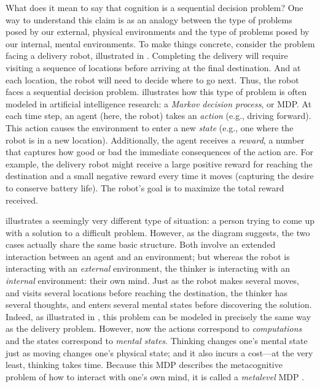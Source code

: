 \documentclass[dsingle]{memo}
\begin{document}
What does it mean to say that cognition is a sequential decision problem? One way to understand this claim is as an analogy between the type of problems posed by our external, physical environments and the type of problems posed by our internal, mental environments. To make things concrete, consider the problem facing a delivery robot, illustrated in . Completing the delivery will require visiting a sequence of locations before arriving at the final destination. And at each location, the robot will need to decide where to go next. Thus, the robot faces a sequential decision problem.  illustrates how this type of problem is often modeled in artificial intelligence research: a \emph{Markov decision process}, or MDP. At each time step, an agent (here, the robot) takes an \emph{action} (e.g., driving forward). This action causes the environment to enter a new \emph{state} (e.g., one where the robot is in a new location). Additionally, the agent receives a \emph{reward}, a number that captures how good or bad the immediate consequences of the action are. For example, the delivery robot might receive a large positive reward for reaching the destination and a small negative reward every time it moves (capturing the desire to conserve battery life). The robot's goal is to maximize the total reward received.

 illustrates a seemingly very different type of situation: a person trying to come up with a solution to a difficult problem. However, as the diagram suggests, the two cases actually share the same basic structure. Both involve an extended interaction between an agent and an environment; but whereas the robot is interacting with an \emph{external} environment, the thinker is interacting with an \emph{internal} environment: their own mind. Just as the robot makes several moves, and visits several locations before reaching the destination, the thinker has several thoughts, and enters several mental states before discovering the solution. Indeed, as illustrated in , this problem can be modeled in precisely the same way as the delivery problem. However, now the actions correspond to \emph{computations} and the states correspond to \emph{mental states}. Thinking changes one's mental state just as moving changes one's physical state; and it also incurs a cost---at the very least, thinking takes time. Because this MDP describes the metacognitive problem of how to interact with one's own mind, it is called a \emph{metalevel} MDP \citep{hay2016principles}.
\end{document}
